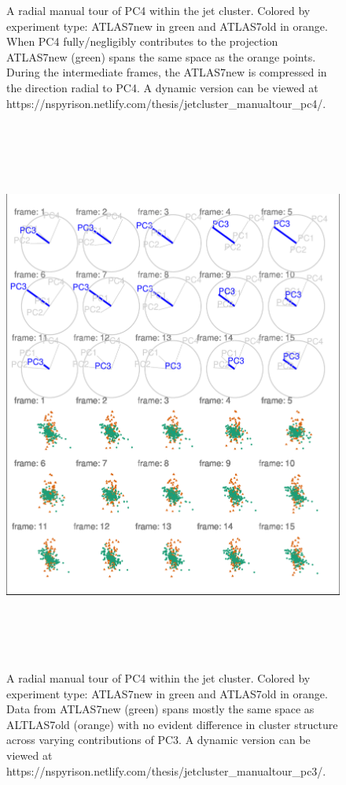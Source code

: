 \begin{Schunk}
\begin{figure}
{}

\caption[A radial manual tour of PC4 within the jet cluster]{A radial manual tour of PC4 within the jet cluster. Colored by experiment type: ATLAS7new in green and ATLAS7old in orange. When PC4 fully/negligibly contributes to the projection ATLAS7new (green) spans the same space as the orange points. During the intermediate frames, the ATLAS7new is compressed in the direction radial to PC4. A dynamic version can be viewed at https://nspyrison.netlify.com/thesis/jetcluster\_manualtour\_pc4/.}\label{fig:JetClusterGood}
\end{figure}
\end{Schunk}

\begin{Schunk}
\begin{figure}

{\centering \includegraphics[width=6in,height=7.2in]{spinifex_paper_files/figure-latex/JetClusterBad-1} 

}

\caption[A radial manual tour of PC4 within the jet cluster]{A radial manual tour of PC4 within the jet cluster. Colored by experiment type: ATLAS7new in green and ATLAS7old in orange. Data from ATLAS7new (green) spans mostly the same space as ALTLAS7old (orange) with no evident difference in cluster structure across varying contributions of PC3. A dynamic version can be viewed at https://nspyrison.netlify.com/thesis/jetcluster\_manualtour\_pc3/.}\label{fig:JetClusterBad}
\end{figure}
\end{Schunk}

